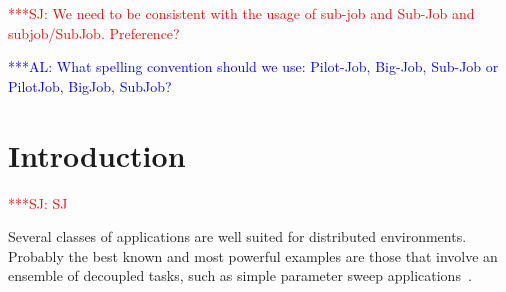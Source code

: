 \documentclass[conference,final]{IEEEtran}
\newcommand{\alnote}[1]{ {\textcolor{blue} { ***AL: #1 }}}
\newcommand{\jhanote}[1]{ {\textcolor{red} { ***SJ: #1 }}}
\newcommand{\alnote}[1]{}
\newcommand{\jhanote}[1]{}
\begin{document}








\jhanote{We need to be consistent with the usage of sub-job and
  Sub-Job and subjob/SubJob. Preference?}

\alnote{What spelling convention should we use: Pilot-Job, Big-Job, Sub-Job or PilotJob, BigJob, SubJob?}

\section{Introduction} \jhanote{SJ}

Several classes of applications are well suited for distributed
environments. Probably the best known and most powerful examples are
those that involve an ensemble of decoupled tasks, such as simple
parameter sweep applications~\cite{1239909}.
\end{document}
